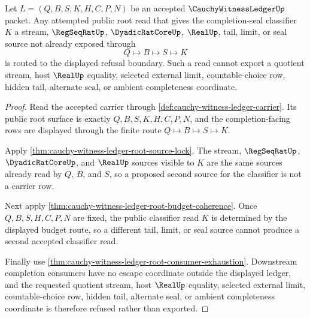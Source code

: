 \begin{theorem}
\label{thm:cauchy-witness-ledger-root-budget-refusal-boundary}
Let $L=(Q,B,S,K,H,C,P,N)$ be an accepted $\CauchyWitnessLedgerUp$ packet. Any attempted public root read that gives the completion-seal classifier $K$ a stream, $\RegSeqRatUp$, $\DyadicRatCoreUp$, $\RealUp$, tail, limit, or seal source not already exposed through
$$
Q \longmapsto B \longmapsto S \longmapsto K
$$
is routed to the displayed refusal boundary. Such a read cannot export a quotient stream, host $\RealUp$ equality, selected external limit, countable-choice row, hidden tail, alternate seal, or ambient completeness coordinate.
\end{theorem}
\begin{proof}
Read the accepted carrier through \autoref{def:cauchy-witness-ledger-carrier}. Its public root surface is exactly $Q,B,S,K,H,C,P,N$, and the completion-facing rows are displayed through the finite route $Q \longmapsto B \longmapsto S \longmapsto K$.

Apply \autoref{thm:cauchy-witness-ledger-root-source-lock}. The stream, $\RegSeqRatUp$, $\DyadicRatCoreUp$, and $\RealUp$ sources visible to $K$ are the same sources already read by $Q$, $B$, and $S$, so a proposed second source for the classifier is not a carrier row.

Next apply \autoref{thm:cauchy-witness-ledger-root-budget-coherence}. Once $Q,B,S,H,C,P,N$ are fixed, the public classifier read $K$ is determined by the displayed budget route, so a different tail, limit, or seal source cannot produce a second accepted classifier read.

Finally use \autoref{thm:cauchy-witness-ledger-root-consumer-exhaustion}. Downstream completion consumers have no escape coordinate outside the displayed ledger, and the requested quotient stream, host $\RealUp$ equality, selected external limit, countable-choice row, hidden tail, alternate seal, or ambient completeness coordinate is therefore refused rather than exported.
\end{proof}

